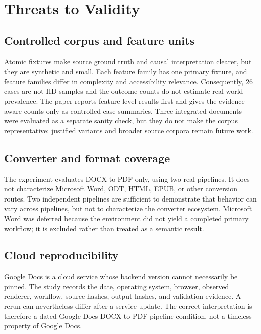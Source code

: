 \section{Threats to Validity}
\label{sec:threats}

\subsection{Controlled corpus and feature units}

Atomic fixtures make source ground truth and causal interpretation clearer, but they are synthetic and small. Each feature family has one primary fixture, and feature families differ in complexity and accessibility relevance. Consequently, 26 cases are not IID samples and the outcome counts do not estimate real-world prevalence. The paper reports feature-level results first and gives the evidence-aware counts only as controlled-case summaries. Three integrated documents were evaluated as a separate sanity check, but they do not make the corpus representative; justified variants and broader source corpora remain future work.

\subsection{Converter and format coverage}

The experiment evaluates DOCX-to-PDF only, using two real pipelines. It does not characterize Microsoft Word, ODT, HTML, EPUB, or other conversion routes. Two independent pipelines are sufficient to demonstrate that behavior can vary across pipelines, but not to characterize the converter ecosystem. Microsoft Word was deferred because the environment did not yield a completed primary workflow; it is excluded rather than treated as a semantic result.

\subsection{Cloud reproducibility}

Google Docs is a cloud service whose backend version cannot necessarily be pinned. The study records the date, operating system, browser, observed renderer, workflow, source hashes, output hashes, and validation evidence. A rerun can nevertheless differ after a service update. The correct interpretation is therefore a dated Google Docs DOCX-to-PDF pipeline condition, not a timeless property of Google Docs.

